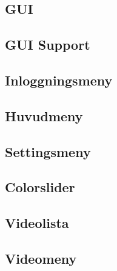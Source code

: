\subsection{GUI}


\subsection{GUI Support}


\subsection{Inloggningsmeny}


\subsection{Huvudmeny}


\subsection{Settingsmeny}


\subsection{Colorslider}


\subsection{Videolista}


\subsection{Videomeny}
